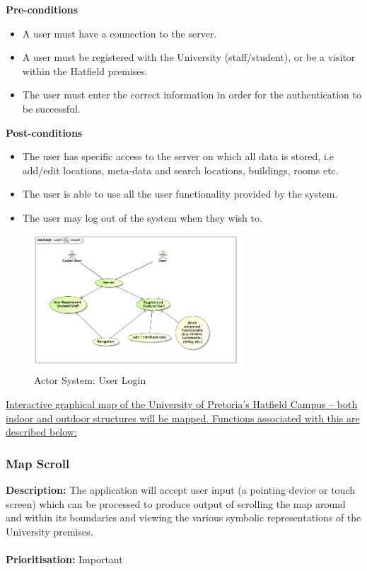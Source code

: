 \documentclass[runningheads,a4paper]{article}
\begin{document}
  
\textbf{Pre-conditions}
\begin{itemize}
 	\item A user must have a connection to the server.
  	\item A user must be registered with the University (staff/student), or be a visitor within the Hatfield premises.
  	\item The user must enter the correct information in order for the authentication to be successful.
\end{itemize}
  
\textbf{Post-conditions}
\begin{itemize}
  	\item The user has specific access to the server on which all data is stored, i.e add/edit locations, meta-data and search locations, buildings, rooms etc.
  	\item The user is able to use all the user functionality provided by the system. 
  	\item The user may log out of the system when they wish to.
\end{itemize}
  
\begin{figure}[H]
   	\centering
   	\includegraphics[width=0.7\textwidth]{LoginActorSystem.jpg}
   	\caption{Actor System: User Login}
\end{figure}
  

\noindent \underline{Interactive graphical map of the University of Pretoria's Hatfield Campus – both indoor and outdoor structures will be mapped. Functions associated with this are described below:}

\subsubsection{Map Scroll}

\textbf{Description:}  The application will accept user input (a pointing device or touch screen) which can be processed to produce output of scrolling the map around and within its boundaries and viewing the various symbolic representations of the University premises.\\\\
\noindent
\textbf{Prioritisation:} Important\\
  
\end{document}
